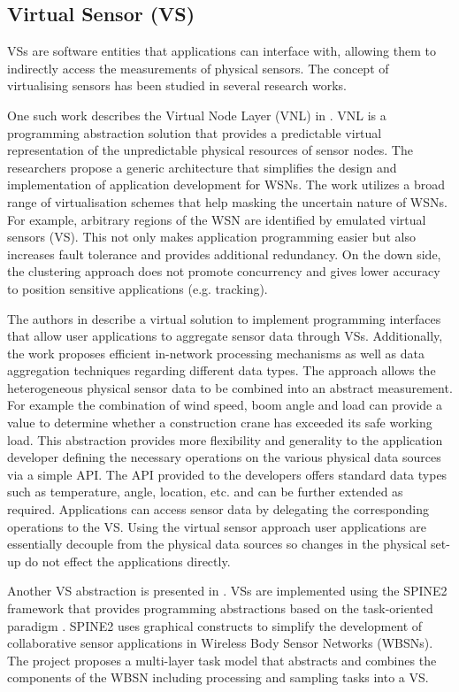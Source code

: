 \subsection{Virtual Sensor (VS)}
VSs are software entities that applications can interface with, allowing them to indirectly access the measurements of physical sensors. The concept of virtualising sensors has been studied in several research works.  

One such work describes the Virtual Node Layer (VNL) in \cite{Brown:2007:VNL:1317103.1317105}. VNL is a programming abstraction solution that provides a predictable virtual representation of the unpredictable physical resources of sensor nodes. The researchers propose a generic architecture that simplifies the design and implementation of application development for WSNs. The work utilizes a broad range of virtualisation schemes that help masking the uncertain nature of WSNs. For example, arbitrary regions of the WSN are identified by emulated virtual sensors (VS). This not only makes application programming easier but also increases fault tolerance and provides additional redundancy. On the down side, the clustering approach does not promote concurrency and gives lower accuracy to position sensitive applications (e.g. tracking).


The authors in \cite{1648519} describe a virtual solution to implement programming interfaces that allow user applications to aggregate sensor data through VSs. Additionally, the work proposes efficient in-network processing mechanisms as well as data aggregation techniques regarding different data types. The approach allows the heterogeneous physical sensor data to be combined into an abstract measurement. For example the combination of wind speed, boom angle and load can provide a value to determine whether a construction crane has exceeded its safe working load. This abstraction provides more flexibility and generality to the application developer defining the necessary operations on the various physical data sources via a simple API. The API provided to the developers offers standard data types such as temperature, angle, location, etc. and can be further extended as required. Applications can access sensor data by delegating the corresponding operations to the VS. Using the virtual sensor approach user applications are essentially decouple  from the physical data sources so changes in the physical set-up do not effect the applications directly. 

Another VS abstraction is presented in \cite{5721776}. VSs are implemented using the SPINE2 framework \cite{5346155} that provides programming abstractions based on the task-oriented paradigm \cite{plasmeijer2012task}. SPINE2 uses graphical constructs to simplify the development of collaborative sensor applications in Wireless Body Sensor Networks (WBSNs). The project proposes a multi-layer task model that abstracts and combines the components of the WBSN including processing and sampling tasks into a VS.